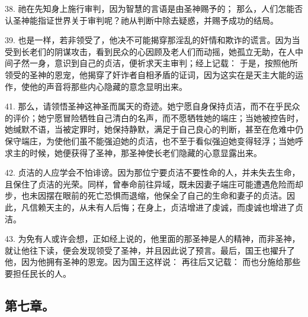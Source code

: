 38. 祂在先知身上施行审判，因为智慧的言语是由圣神赐予的； 那么，人们怎能否认圣神能指证世界关于审判呢？祂从判断中除去疑惑，并赐予成功的结局。\par

39. 也是一样，若非领受了，他决不可能揭穿那淫乱的奸情和欺诈的谎言。因为当受到长老们的阴谋攻击，看到民众的心因顾及老人们而动摇，她孤立无助，在人中间孑然一身，意识到自己的贞洁，便祈求天主审判；经上记载： 于是，按照他所领受的圣神的恩宠，他揭穿了奸诈者自相矛盾的证词，因为这实在是天主大能的运作，使他的声音将那些内心隐藏的意念显明出来。\par

41. 那么，请领悟圣神这神圣而属天的奇迹。她宁愿自身保持贞洁，而不在乎民众的评价；她宁愿冒险牺牲自己清白的名声，而不愿牺牲她的端庄；当她被控告时，她缄默不语，当被定罪时，她保持静默，满足于自己良心的判断，甚至在危难中仍保守端庄，为使他们虽不能强迫她的贞洁，也不至于看似强迫她变得轻浮；当她呼求主的时候，她便获得了圣神，那圣神使长老们隐藏的心意显露出来。\par

42. 贞洁的人应学会不怕诽谤。因为那位宁要贞洁不要性命的人，并未失去生命，且保住了贞洁的光荣。同样，曾奉命前往异域，既未因妻子端庄可能遭遇危险而却步，也未因摆在眼前的死亡恐惧而退缩，他保全了自己的生命和妻子的贞洁。因此，凡信赖天主的，从未有人后悔；在身上，贞洁增进了虔诚，而虔诚也增进了贞洁。\par

43. 为免有人或许会想，正如经上说的，他里面的那圣神是人的精神，而非圣神，就让他往下读，便会发现领受了圣神，并且因此说了预言。最后，国王也擢升了他，因为他拥有圣神的恩宠。因为国王这样说： 再往后又记载： 而也分施给那些要担任民长的人。\par


\subsection{第七章。}

